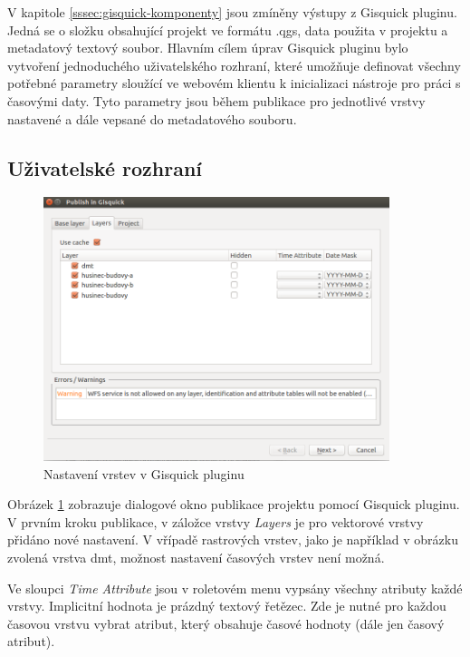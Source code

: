 V kapitole \ref{sssec:gisquick-komponenty} jsou zmíněny výstupy z Gisquick
pluginu. Jedná se o složku obsahující projekt ve formátu .qgs, data
použita v projektu a metadatový textový soubor. Hlavním cílem úprav
Gisquick pluginu bylo vytvoření jednoduchého uživatelského rozhraní,
které umožňuje definovat všechny potřebné parametry sloužící ve
webovém klientu k inicializaci nástroje pro práci s časovými daty. Tyto
parametry jsou během publikace pro jednotlivé vrstvy nastavené a dále
vepsané do metadatového souboru.

\subsection{Uživatelské rozhraní}
\label{sssec:plugin-ui}

\begin{figure}[h!]
\centering
\includegraphics[width=0.9\textwidth]{../img/gisquick-plugin.png}
\caption{Nastavení vrstev v Gisquick pluginu}
\label{fig:gisquick-plugin-layers}
\end{figure}

Obrázek \ref{fig:gisquick-plugin-layers} zobrazuje dialogové okno publikace
projektu pomocí Gisquick pluginu. V prvním kroku publikace, v záložce
vrstvy \textit{Layers} je pro vektorové vrstvy přidáno nové nastavení. V
vřípadě rastrových vrstev, jako je například v obrázku zvolená vrstva dmt,
možnost nastavení časových vrstev není možná.

Ve sloupci \textit{Time Attribute} jsou v roletovém menu vypsány
všechny atributy každé vrstvy. Implicitní hodnota je prázdný textový
řetězec. Zde je nutné pro každou časovou vrstvu vybrat atribut, který
obsahuje časové hodnoty (dále jen časový atribut).

